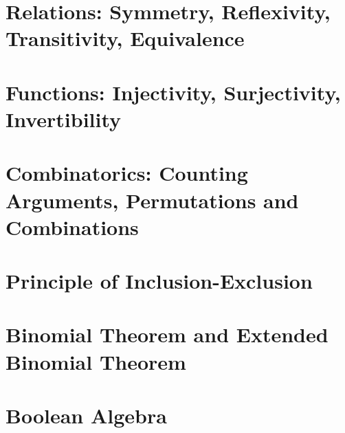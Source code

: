 \section{Relations: Symmetry, Reflexivity, Transitivity, Equivalence}
\label{sec:Relations}

\section{Functions: Injectivity, Surjectivity, Invertibility}
\label{sec:Functions}

\section{Combinatorics: Counting Arguments, Permutations and Combinations}
\label{sec:Combinatorics}

\section{Principle of Inclusion-Exclusion}
\label{sec:InclusionExclusion}

\section{Binomial Theorem and Extended Binomial Theorem}
\label{sec:BinomialTheorem}

\section{Boolean Algebra}
\label{sec:BooleanAlgebra}

